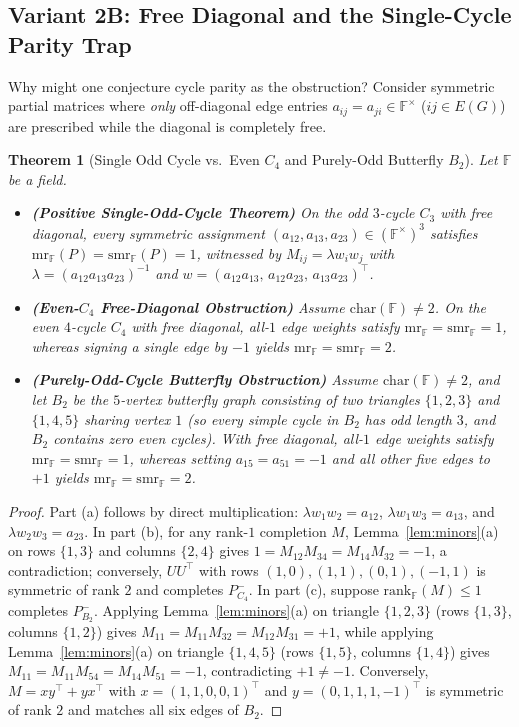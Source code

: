 \documentclass[11pt]{article}
\newtheorem{theorem}{Theorem}[section]
\theoremstyle{definition}
\newcommand{\F}{\mathbb{F}}
\newcommand{\mr}{\mathrm{mr}}
\newcommand{\smr}{\mathrm{smr}}
\newcommand{\rk}{\mathrm{rank}}
\begin{document}
\subsection{Variant 2B: Free Diagonal and the Single-Cycle Parity Trap}

Why might one conjecture cycle parity as the obstruction? Consider symmetric partial matrices where \emph{only} off-diagonal edge entries $a_{ij}=a_{ji}\in \F^\times$ ($ij\in E(G)$) are prescribed while the diagonal is completely free.

\begin{theorem}[Single Odd Cycle vs.\ Even $C_4$ and Purely-Odd Butterfly $B_2$]\label{thm:free-diag}
Let $\F$ be a field.
\begin{itemize}
\item[(a)] \textbf{(Positive Single-Odd-Cycle Theorem)} On the odd $3$-cycle $C_3$ with free diagonal, \emph{every} symmetric assignment $(a_{12},a_{13},a_{23}) \in (\F^\times)^3$ satisfies $\mr_{\F}(P) = \smr_{\F}(P) = 1$, witnessed by $M_{ij} = \lambda w_i w_j$ with $\lambda = (a_{12}a_{13}a_{23})^{-1}$ and $w = (a_{12}a_{13},\, a_{12}a_{23},\, a_{13}a_{23})^\top$.
\item[(b)] \textbf{(Even-$C_4$ Free-Diagonal Obstruction)} Assume $\mathrm{char}(\F)\neq 2$. On the even $4$-cycle $C_4$ with free diagonal, all-$1$ edge weights satisfy $\mr_{\F}=\smr_{\F}=1$, whereas signing a single edge by $-1$ yields $\mr_{\F} = \smr_{\F} = 2$.
\item[(c)] \textbf{(Purely-Odd-Cycle Butterfly Obstruction)} Assume $\mathrm{char}(\F)\neq 2$, and let $B_2$ be the $5$-vertex butterfly graph consisting of two triangles $\{1,2,3\}$ and $\{1,4,5\}$ sharing vertex $1$ (so \emph{every} simple cycle in $B_2$ has odd length $3$, and $B_2$ contains zero even cycles). With free diagonal, all-$1$ edge weights satisfy $\mr_{\F}=\smr_{\F}=1$, whereas setting $a_{15}=a_{51}=-1$ and all other five edges to $+1$ yields $\mr_{\F} = \smr_{\F} = 2$.
\end{itemize}
\end{theorem}
\begin{proof}
Part (a) follows by direct multiplication: $\lambda w_1 w_2 = a_{12}$, $\lambda w_1 w_3 = a_{13}$, and $\lambda w_2 w_3 = a_{23}$.
In part (b), for any rank-$1$ completion $M$, Lemma~\ref{lem:minors}(a) on rows $\{1,3\}$ and columns $\{2,4\}$ gives $1 = M_{12}M_{34} = M_{14}M_{32} = -1$, a contradiction; conversely, $U U^\top$ with rows $(1,0),(1,1),(0,1),(-1,1)$ is symmetric of rank $2$ and completes $P_{C_4}^-$.
In part (c), suppose $\rk_{\F}(M)\le 1$ completes $P_{B_2}^-$. Applying Lemma~\ref{lem:minors}(a) on triangle $\{1,2,3\}$ (rows $\{1,3\}$, columns $\{1,2\}$) gives $M_{11} = M_{11} M_{32} = M_{12} M_{31} = +1$, while applying Lemma~\ref{lem:minors}(a) on triangle $\{1,4,5\}$ (rows $\{1,5\}$, columns $\{1,4\}$) gives $M_{11} = M_{11} M_{54} = M_{14} M_{51} = -1$, contradicting $+1 \neq -1$. Conversely, $M = x y^\top + y x^\top$ with $x = (1,1,0,0,1)^\top$ and $y = (0,1,1,1,-1)^\top$ is symmetric of rank $2$ and matches all six edges of $B_2$.
\end{proof}
\end{document}
